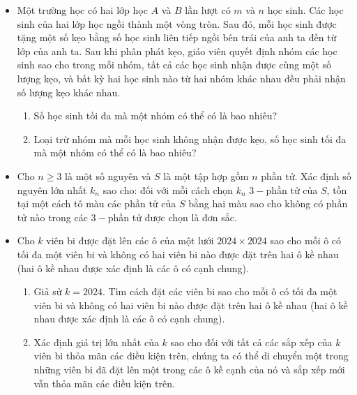 \documentclass[11pt]{scrartcl}
\begin{document}
\begin{itemize}[label=, leftmargin=0em, itemsep=-0em]
    \item \begin{btvn}
    Một trường học có hai lớp học $A$ và $B$ lần lượt có $m$ và $n$ học sinh. Các học sinh của hai lớp học ngồi thành một vòng tròn. Sau đó, mỗi học sinh được tặng một số kẹo bằng số học sinh liên tiếp ngồi bên trái của anh ta đến từ lớp của anh ta. Sau khi phân phát kẹo, giáo viên quyết định nhóm các học sinh sao cho trong mỗi nhóm, tất cả các học sinh nhận được cùng một số lượng kẹo, và bất kỳ hai học sinh nào từ hai nhóm khác nhau đều phải nhận số lượng kẹo khác nhau.
    \begin{enumerate}[label=(\alph*)]
        \item Số học sinh tối đa mà một nhóm có thể có là bao nhiêu?
        \item Loại trừ nhóm mà mỗi học sinh không nhận được kẹo, số học sinh tối đa mà một nhóm có thể có là bao nhiêu?
    \end{enumerate}
    \end{btvn}

    \item \begin{btvn} Cho $n \geq 3$ là một số nguyên và $S$ là một tập hợp gồm $n$ phần tử. Xác định số nguyên lớn nhất $k_n$ sao cho: đối với mỗi cách chọn $k_n$ $3-$phần tử của $S$, tồn tại một cách tô màu các phần tử của $S$ bằng hai màu sao cho không có phần tử nào trong các $3-$phần tử được chọn là đơn sắc.
    \end{btvn}

    \item \begin{btvn}
    Cho $k$ viên bi được đặt lên các ô của một lưới $2024 \times 2024$ sao cho mỗi ô có tối đa một viên bi và không có hai viên bi nào được đặt trên hai ô kề nhau (hai ô kề nhau được xác định là các ô có cạnh chung).
    \begin{enumerate}[label=(\alph*)]
        \item Giả sử $k=2024$. Tìm cách đặt các viên bi sao cho mỗi ô có tối đa một viên bi và không có hai viên bi nào được đặt trên hai ô kề nhau (hai ô kề nhau được xác định là các ô có cạnh chung).
        \item Xác định giá trị lớn nhất của $k$ sao cho đối với tất cả các sắp xếp của $k$ viên bi thỏa mãn các điều kiện trên, chúng ta có thể di chuyển một trong những viên bi đã đặt lên một trong các ô kề cạnh của nó và sắp xếp mới vẫn thỏa mãn các điều kiện trên.
    \end{enumerate}
    \end{btvn}


\end{itemize}
\end{document}
